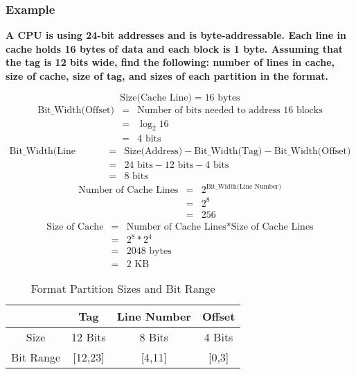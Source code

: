 \documentclass[11pt]{article}
\begin{document}
\subsubsection{Example}

\textbf{A CPU is using 24-bit addresses and is byte-addressable. Each line in cache holds 16 bytes of data and each block is 1 byte. Assuming that the tag is 12 bits wide, find the following: number of lines in cache, size of cache, size of tag, and sizes of each partition in the format.}

\[
\text{Size(Cache Line)} = 16 \text{ bytes}
\]
\begin{eqnarray*}
	\text{Bit\_Width(Offset)} &=& \text{Number of bits needed to address 16 blocks}\\
		&=& \log_2 16\\
		&=& 4 \text{ bits}
\end{eqnarray*}
\begin{eqnarray*}
\text{Bit\_Width(Line Number)} &=& \text{Size(Address)} - \text{Bit\_Width(Tag)} - \text{Bit\_Width(Offset)}\\
	&=& 24 \text{ bits} - 12 \text{ bits} - 4 \text{ bits}\\
	&=& 8 \text{ bits}
\end{eqnarray*}
\begin{eqnarray*}
	\text{Number of Cache Lines} &=& 2^\text{Bit\_Width(Line Number)}\\
		&=& 2^8\\
		&=& 256
\end{eqnarray*}
\begin{eqnarray*}
	\text{Size of Cache} &=& \text{Number of Cache Lines} * \text{Size of Cache Lines}\\
		&=& 2^8 * 2^4\\
		&=& 2048 \text{ bytes}\\
		&=& 2 \text{ KB}
\end{eqnarray*}

\begin{table}[H]
	\centering
	\caption*{Format Partition Sizes and Bit Range}
	\begin{tabular}{| c | c | c | c |}
		\hline
					&	Tag		&	Line Number		&	Offset\\
		\hline
		Size		&	12 Bits	&	8 Bits			&	4 Bits\\
		\hline
		Bit Range	&	[12,23]	&	[4,11]	&	[0,3]\\
		\hline
	\end{tabular}
\end{table}
\end{document}
